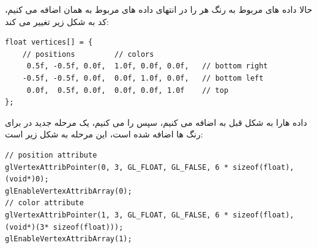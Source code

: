 \documentclass[a4paper, 12pt]{report}
\newcommand{\lrit}[1]{\lr{\textit{#1}}}
\begin{document}
    حالا داده های مربوط به رنگ هر  را در انتهای داده های مربوط به همان  اضافه می کنیم، کد به شکل زیر تغییر می کند:
    \begin{LTR}
    \small
        \begin{lstlisting}[style=C++Style,caption=\lrit{position and color data in one array}]
float vertices[] = {
    // positions         // colors
     0.5f, -0.5f, 0.0f,  1.0f, 0.0f, 0.0f,   // bottom right
    -0.5f, -0.5f, 0.0f,  0.0f, 1.0f, 0.0f,   // bottom left
     0.0f,  0.5f, 0.0f,  0.0f, 0.0f, 1.0f    // top
};
        \end{lstlisting}
    \end{LTR}
    \normalsize
    \vspace*{0.3cm}

    داده هارا به شکل قبل به  اضافه می کنیم، سپس  را  می کنیم، یک مرحله جدید در  برای رنگ ها اضافه شده است، این مرحله به شکل زیر است:
       \begin{LTR}
    \small
        \begin{lstlisting}[style=C++Style,caption=\lrit{position and color data in one array}]
// position attribute
glVertexAttribPointer(0, 3, GL_FLOAT, GL_FALSE, 6 * sizeof(float), (void*)0);
glEnableVertexAttribArray(0);
// color attribute
glVertexAttribPointer(1, 3, GL_FLOAT, GL_FALSE, 6 * sizeof(float), (void*)(3* sizeof(float)));
glEnableVertexAttribArray(1);
        \end{lstlisting}
    \end{LTR}
    \normalsize
    \vspace*{0.3cm}
\end{document}
